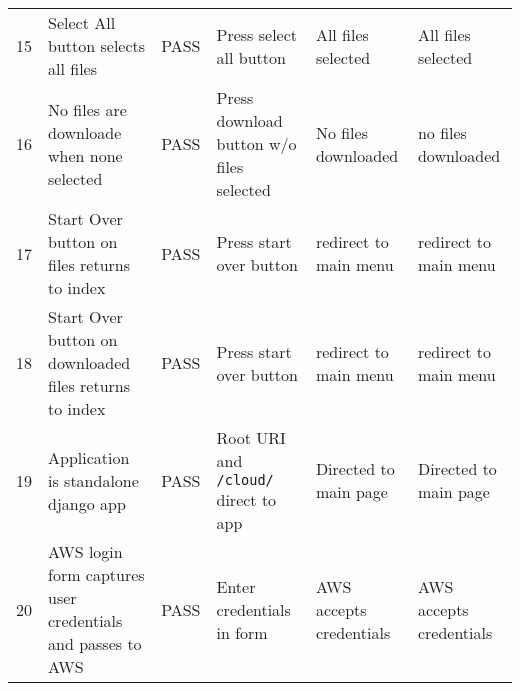 \documentclass{article}
\begin{document}
\begin{landscape}
\begin{center}
\begin{tabular}{|l|l|l|l|l|l|}
      15 & Select All button selects all files & PASS & Press select all button & All files selected & All files selected \\
      16 & No files are downloade when none selected & PASS & Press download button w/o files selected & No files downloaded & no files downloaded \\
      17 & Start Over button on files returns to index & PASS & Press start over button & redirect to main menu & redirect to main menu \\
      18 & Start Over button on downloaded files returns to index & PASS & Press start over button & redirect to main menu & redirect to main menu \\
      19 & Application is standalone django app & PASS & Root URI and \texttt{/cloud/} direct to app & Directed to main page & Directed to main page \\
      20 & AWS login form captures user credentials and passes to AWS & PASS & Enter credentials in form & AWS accepts credentials & AWS accepts credentials \\
      \hline

      \hline
    \end{tabular}
    \end{center}
    \end{landscape}
\end{document}
